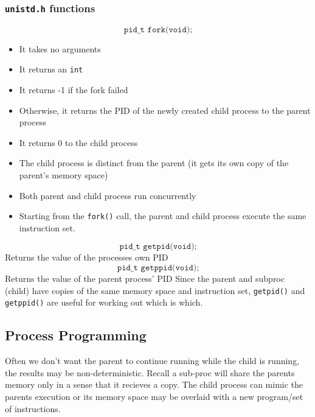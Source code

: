 \documentclass[a4paper, 10pt]{article}
\begin{document}
\subsubsection{\texttt{unistd.h} functions}
$$\boxed{\texttt{pid\_t fork(void);}}$$
\begin{itemize}
    \item It takes no arguments
    \item It returns an \texttt{int}
    \item It returns -1 if the fork failed
    \item Otherwise, it returns the PID of the newly created child process to the parent process
    \item It returns 0 to the child process
    \item The child process is distinct from the parent (it gets its own copy of the parent's memory space)
    \item Both parent and child process run concurrently
    \item Starting from the \texttt{fork()} call, the parent and child process execute the same instruction set.
\end{itemize}
$$\boxed{\texttt{pid\_t getpid(void);}}$$
Returns the value of the processes own PID
$$\boxed{\texttt{pid\_t getppid(void);}}$$
Returns the value of the parent process' PID
Since the parent and subproc (child) have copies of the same memory space and instruction set, \texttt{getpid()}  and \texttt{getppid()} are useful for working out which is which.

\subsection{Process Programming}
Often we don't want the parent to continue running while the child is running, the results may be non-deterministic. Recall a sub-proc will share the parents memory only in a sense that it recieves a copy. The  child process can mimic the parents execution  or its memory space may be overlaid with a new program/set of instructions. \\[2ex]
\end{document}

